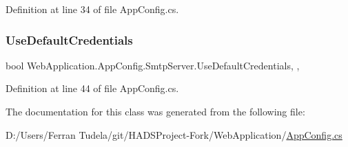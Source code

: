Definition at line 34 of file App\+Config.\+cs.

\mbox{\label{classWebApplication_1_1AppConfig_1_1SmtpServer_a12805019c21ec023c97a6bdc2c3b9273}} 
\subsubsection{\texorpdfstring{UseDefaultCredentials}{UseDefaultCredentials}}
{\footnotesize\ttfamily bool Web\+Application.\+App\+Config.\+Smtp\+Server.\+Use\+Default\+Credentials\hspace{0.3cm}{\ttfamily [static]}, {\ttfamily [get]}, {\ttfamily [set]}}







Definition at line 44 of file App\+Config.\+cs.



The documentation for this class was generated from the following file\+:\begin{DoxyCompactItemize}
\item 
D\+:/\+Users/\+Ferran Tudela/git/\+H\+A\+D\+S\+Project-\/\+Fork/\+Web\+Application/\mbox{\hyperlink{AppConfig_8cs}{App\+Config.\+cs}}\end{DoxyCompactItemize}
